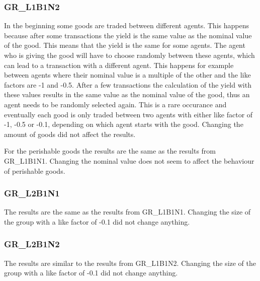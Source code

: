 \documentclass[twoside,openright]{uva-bachelor-thesis}
\begin{document}
\subsubsection{GR\_L1B1N2}
In the beginning some goods are traded between different agents. This happens because after some transactions the yield is the same value as the nominal value of the good. This means that the yield is the same for some agents. The agent who is giving the good will have to choose randomly between these agents, which can lead to a transaction with a different agent. This happens for example between agents where their nominal value is a multiple of the other and the like factors are -1 and -0.5. After a few transactions the calculation of the yield with these values results in the same value as the nominal value of the good, thus an agent needs to be randomly selected again. This is a rare occurance and eventually each good is only traded between two agents with either like factor of -1, -0.5 or -0.1, depending on which agent starts with the good. Changing the amount of goods did not affect the results.

For the perishable goods the results are the same as the results from GR\_L1B1N1. Changing the nominal value does not seem to affect the behaviour of perishable goods.
\subsubsection{GR\_L2B1N1}
The results are the same as the results from GR\_L1B1N1. Changing the size of the group with a like factor of -0.1 did not change anything. 
\subsubsection{GR\_L2B1N2}
The results are similar to the results from GR\_L1B1N2.  Changing the size of the group with a like factor of -0.1 did not change anything. 

\clearpage
\end{document}
